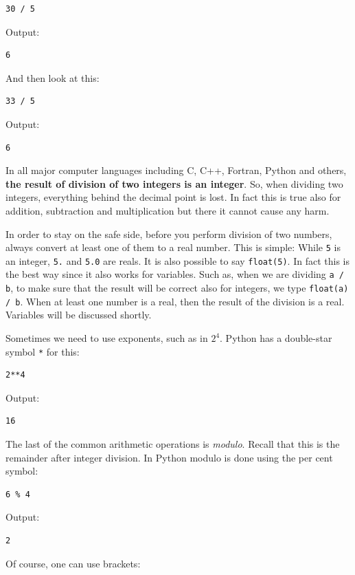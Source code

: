 \documentclass[article,A4,12pt]{llncs}
\begin{document}
\begin{verbatim}
30 / 5
\end{verbatim}
Output:

\begin{verbatim}
6
\end{verbatim}
And then look at this:

\begin{verbatim}
33 / 5
\end{verbatim}
Output:

\begin{verbatim}
6
\end{verbatim}
In all major computer languages including C, C++, Fortran, Python and 
others, {\bf the result of division of two integers is an integer}. 
So, when dividing two integers, everything behind the decimal point is lost.
In fact this is true also for addition, subtraction and multiplication 
but there it cannot cause any harm. 

In order to stay on the safe side, 
before you perform division of two numbers, always convert at least one of them
to a real number. This is simple: While {\tt 5} is an integer, {\tt 5.}
and {\tt 5.0} are reals. It is also possible to 
say {\tt float(5)}. In fact this is the best way since it also works for 
variables. Such as, when we are dividing {\tt a / b}, to make sure that 
the result will be correct also for integers, we type {\tt float(a) / b}. 
When at least one number is a real, then the result of the division is a real.   
Variables will be discussed shortly.

Sometimes we need to use exponents, such as in $2^4$. Python has a double-star
symbol {\tt **} for this:

\begin{verbatim}
2**4
\end{verbatim}
Output:

\begin{verbatim}
16
\end{verbatim}
The last of the common arithmetic operations is {\em modulo}. Recall that this is the remainder 
after integer division. In Python modulo is done using the per cent symbol:

\begin{verbatim}
6 % 4
\end{verbatim}
Output:

\begin{verbatim}
2
\end{verbatim}
Of course, one can use brackets:
\end{document}
